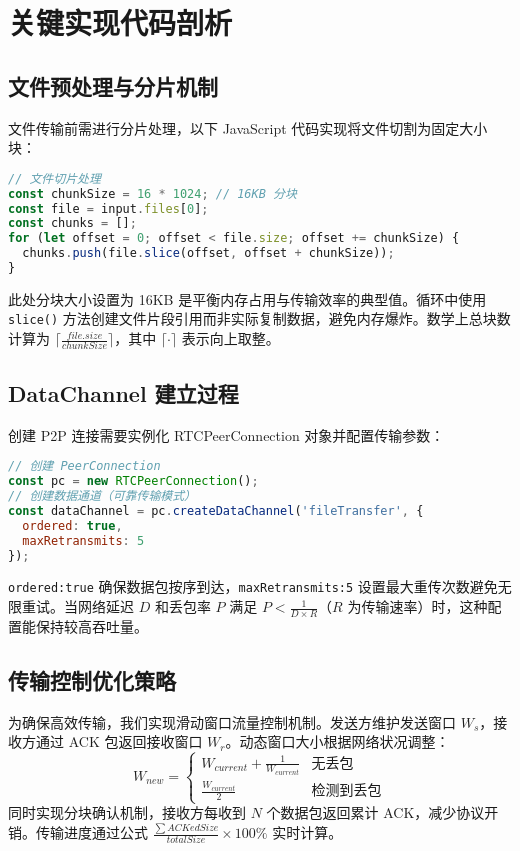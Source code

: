 \chapter{关键实现代码剖析}
\section{文件预处理与分片机制}
文件传输前需进行分片处理，以下 JavaScript 代码实现将文件切割为固定大小块：\par
\begin{lstlisting}[language=javascript]
// 文件切片处理
const chunkSize = 16 * 1024; // 16KB 分块
const file = input.files[0];
const chunks = [];
for (let offset = 0; offset < file.size; offset += chunkSize) {
  chunks.push(file.slice(offset, offset + chunkSize));
}
\end{lstlisting}
此处分块大小设置为 16KB 是平衡内存占用与传输效率的典型值。循环中使用 \texttt{slice()} 方法创建文件片段引用而非实际复制数据，避免内存爆炸。数学上总块数计算为 $\lceil \frac{file.size}{chunkSize} \rceil$，其中 $\lceil \cdot \rceil$ 表示向上取整。\par
\section{DataChannel 建立过程}
创建 P2P 连接需要实例化 RTCPeerConnection 对象并配置传输参数：\par
\begin{lstlisting}[language=javascript]
// 创建 PeerConnection
const pc = new RTCPeerConnection();
// 创建数据通道（可靠传输模式）
const dataChannel = pc.createDataChannel('fileTransfer', {
  ordered: true, 
  maxRetransmits: 5
});
\end{lstlisting}
\texttt{ordered:true} 确保数据包按序到达，\texttt{maxRetransmits:5} 设置最大重传次数避免无限重试。当网络延迟 $D$ 和丢包率 $P$ 满足 $P < \frac{1}{D \times R}$（$R$ 为传输速率）时，这种配置能保持较高吞吐量。\par
\section{传输控制优化策略}
为确保高效传输，我们实现滑动窗口流量控制机制。发送方维护发送窗口 $W_s$，接收方通过 ACK 包返回接收窗口 $W_r$。动态窗口大小根据网络状况调整：
$$ W_{new} = \begin{cases} W_{current} + \frac{1}{W_{current}} & \text{无丢包} \\ \frac{W_{current}}{2} & \text{检测到丢包} \end{cases} $$
同时实现分块确认机制，接收方每收到 $N$ 个数据包返回累计 ACK，减少协议开销。传输进度通过公式 $\frac{\sum ACKedSize}{totalSize} \times 100\%$ 实时计算。\par
